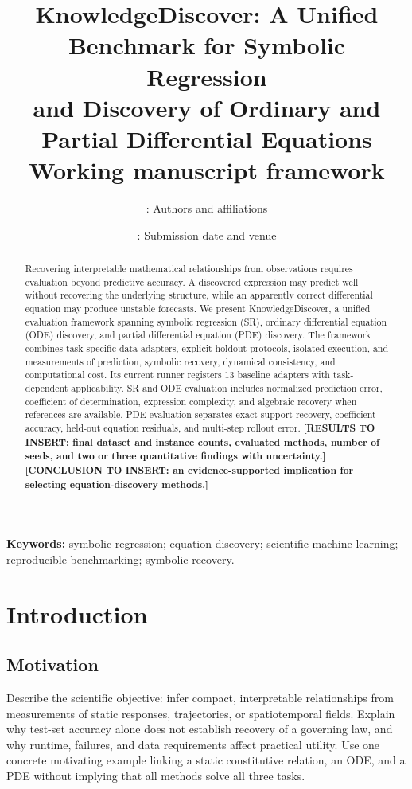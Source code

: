 \documentclass[11pt,a4paper]{article}
\title{KnowledgeDiscover: A Unified Benchmark for Symbolic Regression\\
and Discovery of Ordinary and Partial Differential Equations\\
\large Working manuscript framework}
\author{\pending{}: Authors and affiliations}
\date{\pending{}: Submission date and venue}
\begin{document}
\maketitle
\begin{abstract}
Recovering interpretable mathematical relationships from observations requires
evaluation beyond predictive accuracy. A discovered expression may predict well
without recovering the underlying structure, while an apparently correct
differential equation may produce unstable forecasts. We present
KnowledgeDiscover, a unified evaluation framework spanning symbolic regression
(SR), ordinary differential equation (ODE) discovery, and partial differential
equation (PDE) discovery. The framework combines task-specific data adapters,
explicit holdout protocols, isolated execution, and measurements of prediction,
symbolic recovery, dynamical consistency, and computational cost. Its current
runner registers 13 baseline adapters with task-dependent applicability.
SR and ODE evaluation includes normalized prediction error, coefficient of
determination, expression complexity, and algebraic recovery when references
are available. PDE evaluation separates exact support recovery, coefficient
accuracy, held-out equation residuals, and multi-step rollout error.
\textbf{[RESULTS TO INSERT: final dataset and instance counts, evaluated methods,
number of seeds, and two or three quantitative findings with uncertainty.]}
\textbf{[CONCLUSION TO INSERT: an evidence-supported implication for selecting
equation-discovery methods.]}
\end{abstract}

\noindent\textbf{Keywords:} symbolic regression; equation discovery; scientific
machine learning; reproducible benchmarking; symbolic recovery.

\section{Introduction}
\label{sec:introduction}
\subsection{Motivation}
Describe the scientific objective: infer compact, interpretable relationships
from measurements of static responses, trajectories, or spatiotemporal fields.
Explain why test-set accuracy alone does not establish recovery of a governing
law, and why runtime, failures, and data requirements affect practical utility.
Use one concrete motivating example linking a static constitutive relation,
an ODE, and a PDE without implying that all methods solve all three tasks.
\end{document}
